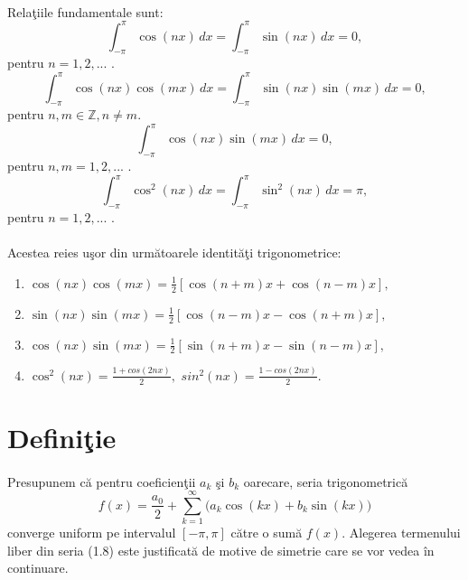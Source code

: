 \documentclass[a4paper,openany,12pt]{report}
\begin{document}
\paragraph{} Rela\c tiile fundamentale sunt:
\begin{equation}
\int_{-\pi}^{\pi} \cos(nx)\,dx = \int_{-\pi}^{\pi} \sin(nx)\,dx = 0, 
\end{equation}
pentru $n = 1, 2, ...$ .
\begin{equation}
\int_{-\pi}^{\pi} \cos(nx)\cos(mx)\,dx = \int_{-\pi}^{\pi} \sin(nx)\sin(mx)\,dx = 0, 
\end{equation}
pentru $n, m \in \mathbb{Z}, n \neq m$.
\begin{equation}
\int_{-\pi}^{\pi} \cos(nx)\sin(mx)\,dx = 0,
\end{equation}
pentru $n, m = 1, 2, ...$ .
\begin{equation}
\int_{-\pi}^{\pi} \cos^2(nx)\,dx = \int_{-\pi}^{\pi} \sin^2(nx)\,dx = \pi,
\end{equation}
pentru $n = 1, 2, ...$ .
\paragraph*{}Acestea reies u\c sor din urm\u atoarele identit\u a\c ti trigonometrice:
\begin{enumerate}
	\item $\cos(nx)\cos(mx) = \frac{1}{2} [\cos(n + m)x + \cos(n - m)x],$
	\item $\sin(nx)\sin(mx) = \frac{1}{2} [\cos(n - m)x - \cos(n + m)x],$
	\item $\cos(nx)\sin(mx) = \frac{1}{2} [\sin(n + m)x - \sin(n - m)x],$
	\item $\cos^2(nx) = \frac{1 + cos(2nx)}{2},$ $sin^2(nx) = \frac{1 - cos(2nx)}{2}.$
\end{enumerate}



\section{Defini\c tie}
\paragraph*{}Presupunem c\u a pentru coeficien\c tii $a_k$ \c si $b_k$ oarecare, seria trigonometric\u a
\begin{equation}
f(x) = \frac{a_0}{2} + \sum_{k=1}^\infty \Big(a_k\cos(kx) + b_k\sin(kx)\Big)
\end{equation}
converge uniform pe intervalul $[-\pi, \pi]$ c\u atre o sum\u a $f(x)$. Alegerea termenului liber din seria (1.8) este justificat\u a de motive de simetrie care se vor vedea \^ in continuare.
\end{document}
